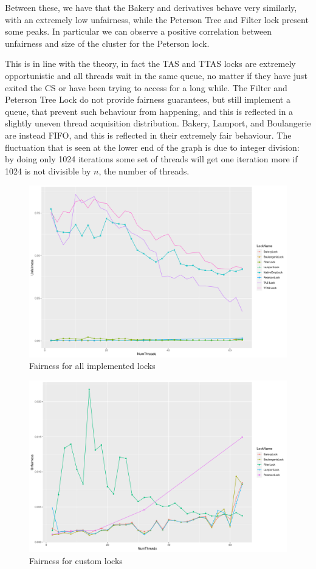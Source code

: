 Between these, we have that the Bakery and derivatives behave very similarly, with
an extremely low unfairness, while the Peterson Tree and Filter lock present some peaks.
In particular we can observe a positive correlation between unfairness and size of
the cluster for the Peterson lock.

This is in line with the theory, in fact the TAS and TTAS locks are extremely
opportunistic and all threads wait in the same queue, no matter if they have
just exited the CS or have been trying to access for a long while.
The Filter and Peterson Tree Lock do not provide fairness guarantees, but still
implement a queue, that prevent such behaviour from happening, and this is
reflected in a slightly uneven thread acquisition distribution.
Bakery, Lamport, and Boulangerie are instead FIFO, and this is reflected in
their extremely fair behaviour. The fluctuation that is seen at the lower end
of the graph is due to integer division: by doing only 1024 iterations some
set of threads will get one iteration more if 1024 is not divisible by $n$, the 
number of threads.

\begin{figure}[H]
  \includegraphics[width=\textwidth]{fig/fairness_all}
  \caption{Fairness for all implemented locks}
  \label{fig:fairness-all}
\end{figure}

\begin{figure}[H]
  \includegraphics[width=\textwidth]{fig/fairness_no_tas}
  \caption{Fairness for custom locks}
  \label{fig:fairness-no-tas}
\end{figure}
